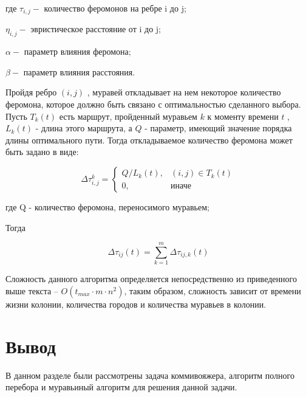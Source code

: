 где \quad$ \tau_{i,j} - $ количество феромонов на ребре i до j;

$\eta_{i,j} - $ эвристическое расстояние от i до j;

$\alpha - $ параметр влияния феромона;

$\beta - $ параметр влияния расстояния.


Пройдя ребро $(i,j)$ , муравей откладывает на нем некоторое количество феромона, которое должно быть связано с оптимальностью сделанного выбора. Пусть $T _{k} (t)$ есть маршрут, пройденный муравьем $k$ к моменту времени $t$ , $L _{k} (t)$ - длина этого маршрута, а $Q$ - параметр, имеющий значение порядка длины оптимального пути. Тогда откладываемое количество феромона может быть задано в виде:

\begin{equation}\label{form:add} 
	{\displaystyle \Delta \tau _{i,j}^k={\begin{cases}Q/L_{k}(t),& {(i,j)\in T_k(t)}\\0,&{\mbox{иначе}}\end{cases}}}
\end{equation}

где \quad Q - количество феромона, переносимого муравьем;


Тогда

\begin{equation}\label{form:add1} 
	\Delta \tau _{ij}(t)= \sum_{k=1}^{m} \Delta \tau _{ij,k}(t)
\end{equation}



Сложность данного алгоритма определяется непосредственно из приведенного выше текста --
$O(t_{max} \cdot m \cdot n^2)$, таким образом, сложность зависит от
времени жизни колонии, количества городов и количества муравьев в колонии.


\section{Вывод}
В данном разделе были рассмотрены задача коммивояжера,
алгоритм полного перебора и муравьиный алгоритм для решения данной задачи.
